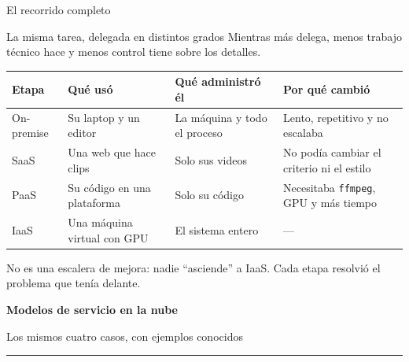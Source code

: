 \documentclass[aspectratio=169,10pt,c]{beamer}
\begin{document}
\begin{frame}{El recorrido completo}
\begin{block}{La misma tarea, delegada en distintos grados}
\small Mientras más delega, menos trabajo técnico hace y menos control tiene sobre los detalles.
\end{block}
\renewcommand{\arraystretch}{1.25}
\centering\small
\begin{tabular}{@{}p{2.2cm}p{3.5cm}p{3.4cm}p{3.6cm}@{}}
\toprule
\textbf{Etapa} & \textbf{Qué usó} & \textbf{Qué administró él} & \textbf{Por qué cambió}\\
\midrule
On-premise & Su laptop y un editor & La máquina y todo el proceso & Lento, repetitivo y no escalaba\\
SaaS & Una web que hace clips & Solo sus videos & No podía cambiar el criterio ni el estilo\\
PaaS & Su código en una plataforma & Solo su código & Necesitaba \texttt{ffmpeg}, GPU y más tiempo\\
IaaS & Una máquina virtual con GPU & El sistema entero & ---\\
\bottomrule
\end{tabular}
\par\vspace{2mm}
\footnotesize No es una escalera de mejora: nadie ``asciende'' a IaaS. Cada etapa resolvió el problema que tenía delante.
\end{frame}

\begin{frame}[plain]
\vfill
\begin{center}
{\fontsize{29}{34}\selectfont\bfseries Modelos de servicio en la nube}\par
\vspace{2mm}
{\small Los mismos cuatro casos, con ejemplos conocidos}\par
\vspace{4mm}
{\color{utpRojo}\rule{8.5cm}{1.2pt}}
\end{center}
\vfill
\end{frame}
\end{document}
